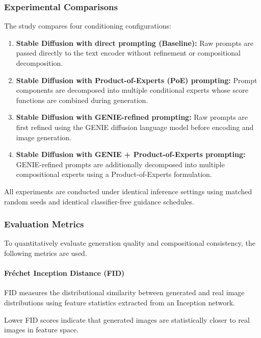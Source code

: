 \documentclass[a4paper,twoside,12pt]{report}
\begin{document}
\subsubsection{Experimental Comparisons}

The study compares four conditioning configurations:
\begin{enumerate}
    \item \textbf{Stable Diffusion with direct prompting (Baseline):}  
    Raw prompts are passed directly to the text encoder without refinement or compositional decomposition.

    \item \textbf{Stable Diffusion with Product-of-Experts (PoE) prompting:}  
    Prompt components are decomposed into multiple conditional experts whose score functions are combined during generation.

    \item \textbf{Stable Diffusion with GENIE-refined prompting:}  
    Raw prompts are first refined using the GENIE diffusion language model before encoding and image generation.

    \item \textbf{Stable Diffusion with GENIE + Product-of-Experts prompting:}  
    GENIE-refined prompts are additionally decomposed into multiple compositional experts using a Product-of-Experts formulation.
\end{enumerate}

All experiments are conducted under identical inference settings using matched random seeds and identical classifier-free guidance schedules.

\subsubsection{Evaluation Metrics}

To quantitatively evaluate generation quality and compositional consistency, the following metrics are used.

\paragraph{Fréchet Inception Distance (FID)}

FID measures the distributional similarity between generated and real image distributions using feature statistics extracted from an Inception network.

Lower FID scores indicate that generated images are statistically closer to real images in feature space.
\end{document}
